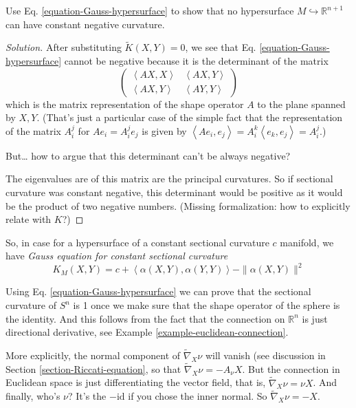 \begin{exercise}
\label{exercise-Gauss-sectional}
Use Eq. \ref{equation-Gauss-hypersurface} to show that no 
hypersurface $M \hookrightarrow \mathbb{R}^{n+1}$ can have constant negative 
curvature.
\end{exercise}

\begin{proof}[Solution]
After substituting $\tilde{K}(X,Y)=0$, we see that Eq. 
\ref{equation-Gauss-hypersurface} cannot be negative because it is the
determinant of the matrix
$$
\begin{pmatrix}
\left<AX,X\right>&\left<AX,Y\right>\\ 
\left<AX,Y\right>&\left<AY,Y\right>
\end{pmatrix}
$$
which is the matrix representation of the shape operator $A$ to the plane
spanned by $X,Y$. (That's just a particular case of the simple fact that the
representation of the matrix $A_i^j$ for $Ae_i=A_i^je_j$ is given by
$\left<Ae_i,e_j\right>=A^k_i\left<e_k,e_j\right>=A^j_i$.)

But… how to argue that this determinant can't be always negative?

The eigenvalues are of this matrix are the principal curvatures. 
So if sectional curvature was constant negative, this determinant would be 
positive as it would be the product of two negative numbers. (Missing
formalization: how to explicitly relate with $K$?)
\end{proof}

So, in case for a hypersurface of a constant sectional curvature $c$ manifold,
we have {\it Gauss equation for constant sectional curvature}
\begin{equation}
\label{equation-Gauss-constant-sectional-curvature}
K_M(X,Y)=c+\left<\alpha(X,Y),\alpha(Y,Y)\right>-\|\alpha(X,Y)\|^2
\end{equation}

\begin{example}
\label{example-curvature-of-sphere}
Using Eq. \ref{equation-Gauss-hypersurface} we can prove that the sectional
curvature of $S^n$ is 1 once we make sure that the shape operator of the sphere
is the identity. And this follows from the fact that the connection on
$\mathbb{R}^n$ is just directional derivative, see Example 
\ref{example-euclidean-connection}.

More explicitly, the normal component of $\tilde{\nabla}_X\nu$ will vanish (see
discussion in Section \ref{section-Riccati-equation}, so that
$\tilde{\nabla}_X\nu=-A_\nu X$. But the connection in Euclidean space is just
differentiating the vector field, that is, $\tilde{\nabla}_X\nu=\nu X$. And
finally, who's $\nu$? It's the $-\text{id}$ if you chose the inner normal. So
 $\tilde{\nabla}_X\nu=-X$.
\end{example}


